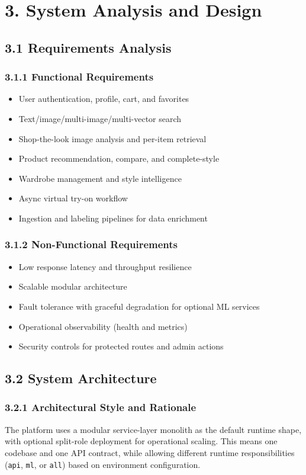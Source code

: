\documentclass[12pt,a4paper]{report}
\begin{document}
\chapter{3. System Analysis and Design}
\section{3.1 Requirements Analysis}
\subsection{3.1.1 Functional Requirements}
\begin{itemize}
\item User authentication, profile, cart, and favorites
\item Text/image/multi-image/multi-vector search
\item Shop-the-look image analysis and per-item retrieval
\item Product recommendation, compare, and complete-style
\item Wardrobe management and style intelligence
\item Async virtual try-on workflow
\item Ingestion and labeling pipelines for data enrichment
\end{itemize}

\subsection{3.1.2 Non-Functional Requirements}
\begin{itemize}
\item Low response latency and throughput resilience
\item Scalable modular architecture
\item Fault tolerance with graceful degradation for optional ML services
\item Operational observability (health and metrics)
\item Security controls for protected routes and admin actions
\end{itemize}

\section{3.2 System Architecture}
\subsection{3.2.1 Architectural Style and Rationale}
The platform uses a modular service-layer monolith as the default runtime shape, with optional split-role deployment for operational scaling. This means one codebase and one API contract, while allowing different runtime responsibilities (\texttt{api}, \texttt{ml}, or \texttt{all}) based on environment configuration.
\end{document}
